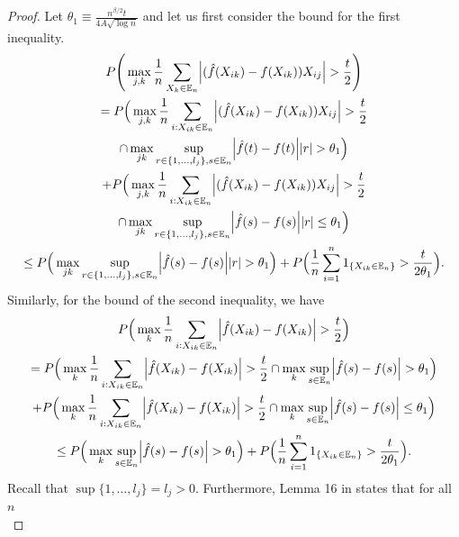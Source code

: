 \begin{lemma}
    \begin{proof}
        Let $\theta_1 \equiv \frac{n^{\beta/2}t}{4A\sqrt{\log n}}$ and let us first consider the bound for the first inequality.
        \begin{multline*}
            P\Bigg(\max_{j,k} \frac{1}{n} \sum_{X_k \in \mathbb{E}_n} \abs{(\hat{f}(X_{ik}) - f(X_{ik}))X_{ij}} > \frac{t}{2}\Bigg) \\
            =  P\Big(\max_{j,k} \frac{1}{n} \sum_{i: X_{ik} \in \mathbb{E}_n} \abs{(\hat{f}(X_{ik}) - f(X_{ik}))X_{ij}} > \frac{t}{2} \\
            \cap \max_{jk} \sup_{r \in \{1,\dots,l_{j}\}, s \in \mathbb{E}_n} \abs{\hat{f}(t) - f(t)}\abs{r} > \theta_1 \Big) \\
            + P\Big(\max_{j,k} \frac{1}{n} \sum_{i: X_{ik} \in \mathbb{E}_n} \abs{(\hat{f}(X_{ik}) - f(X_{ik}))X_{ij}} > \frac{t}{2} \\
            \cap \max_{jk} \sup_{r \in \{1,\dots,l_{j}\}, s \in \mathbb{E}_n} \abs{\hat{f}(s) - f(s)}\abs{r} \leq \theta_1 \Big) \\
            \leq P\Big(\max_{jk} \sup_{r \in \{1,\dots,l_{j}\}, s \in \mathbb{E}_n} \abs{\hat{f}(s) - f(s)}\abs{r} > \theta_1 \Big) + P\Big(\frac{1}{n} \sum_{i = 1}^n 1_{\{X_{ik} \in \mathbb{E}_n\}} > \frac{t}{2\theta_1}\Big).
        \end{multline*}
        Similarly, for the bound of the second inequality, we have
        \begin{multline*}
            P\Big(\max_k \frac{1}{n} \sum_{i: X_{ik} \in \mathbb{E}_n} \abs{\hat{f}(X_{ik}) - f(X_{ik})} > \frac{t}{2}\Big) \\
            =  P\Big(\max_k \frac{1}{n} \sum_{i: X_{ik} \in \mathbb{E}_n} \abs{\hat{f}(X_{ik}) - f(X_{ik})} > \frac{t}{2} \cap \max_k \sup_{s \in \mathbb{E}_n} \abs{\hat{f}(s) - f(s)} > \theta_1 \Big) \\
            + P\Big(\max_k \frac{1}{n} \sum_{i: X_{ik} \in \mathbb{E}_n} \abs{\hat{f}(X_{ik}) - f(X_{ik})} > \frac{t}{2} \cap \max_k \sup_{s \in \mathbb{E}_n} \abs{\hat{f}(s) - f(s)} \leq \theta_1\Big) \\
            \leq P\Big(\max_k \sup_{s \in \mathbb{E}_n} \abs{\hat{f}(s) - f(s)} > \theta_1 \Big) + P\Big(\frac{1}{n} \sum_{i = 1}^n 1_{\{X_{ik} \in \mathbb{E}_n\}} > \frac{t}{2\theta_1}\Big).
        \end{multline*}
        Recall that $\sup \{1,\dots,l_{j}\} = l_{j} > 0$. Furthermore, Lemma 16 in \cite{Liu09} states that for all $n$
        \begin{equation}

\end{equation}
\end{proof}
\end{lemma}
